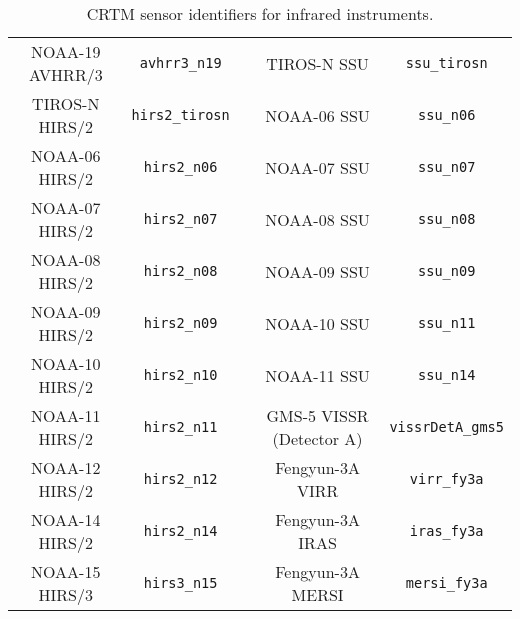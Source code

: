 \begin{table}[htp]
\begin{tabular}{c c c c c}
NOAA-19 AVHRR/3           & \texttt{avhrr3\_n19}     & \hspace{0.2cm} & TIROS-N SSU                  & \texttt{ssu\_tirosn}       \\
TIROS-N HIRS/2            & \texttt{hirs2\_tirosn}   & \hspace{0.2cm} & NOAA-06 SSU                  & \texttt{ssu\_n06}          \\
NOAA-06 HIRS/2            & \texttt{hirs2\_n06}      & \hspace{0.2cm} & NOAA-07 SSU                  & \texttt{ssu\_n07}          \\
NOAA-07 HIRS/2            & \texttt{hirs2\_n07}      & \hspace{0.2cm} & NOAA-08 SSU                  & \texttt{ssu\_n08}          \\
NOAA-08 HIRS/2            & \texttt{hirs2\_n08}      & \hspace{0.2cm} & NOAA-09 SSU                  & \texttt{ssu\_n09}          \\
NOAA-09 HIRS/2            & \texttt{hirs2\_n09}      & \hspace{0.2cm} & NOAA-10 SSU                  & \texttt{ssu\_n11}          \\
NOAA-10 HIRS/2            & \texttt{hirs2\_n10}      & \hspace{0.2cm} & NOAA-11 SSU                  & \texttt{ssu\_n14}          \\
NOAA-11 HIRS/2            & \texttt{hirs2\_n11}      & \hspace{0.2cm} & GMS-5 VISSR (Detector A)     & \texttt{vissrDetA\_gms5}   \\
NOAA-12 HIRS/2            & \texttt{hirs2\_n12}      & \hspace{0.2cm} & Fengyun-3A VIRR              & \texttt{virr\_fy3a}        \\
NOAA-14 HIRS/2            & \texttt{hirs2\_n14}      & \hspace{0.2cm} & Fengyun-3A IRAS              & \texttt{iras\_fy3a}        \\
NOAA-15 HIRS/3            & \texttt{hirs3\_n15}      & \hspace{0.2cm} & Fengyun-3A MERSI             & \texttt{mersi\_fy3a}       \\   
    \hline
  \end{tabular}
  \caption{CRTM sensor identifiers for infrared instruments.}
  \label{tab:ir_sensor_id}
\end{table}

\clearpage

